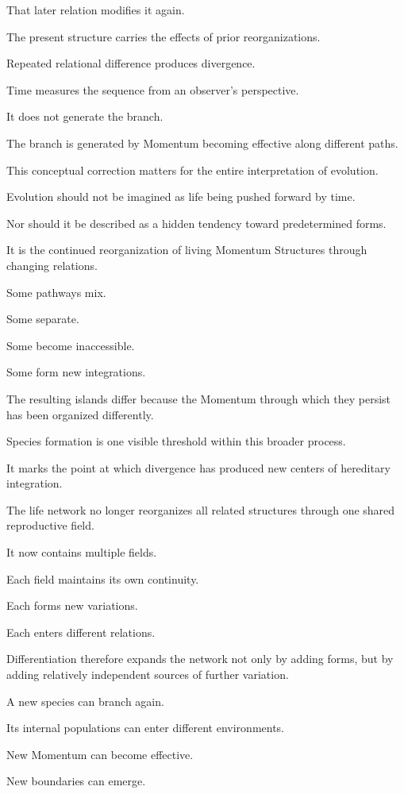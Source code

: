 That later relation modifies it again.

The present structure carries the effects of prior reorganizations.

Repeated relational difference produces divergence.

Time measures the sequence from an observer’s perspective.

It does not generate the branch.

The branch is generated by Momentum becoming effective along different paths.

This conceptual correction matters for the entire interpretation of evolution.

Evolution should not be imagined as life being pushed forward by time.

Nor should it be described as a hidden tendency toward predetermined forms.

It is the continued reorganization of living Momentum Structures through changing relations.

Some pathways mix.

Some separate.

Some become inaccessible.

Some form new integrations.

The resulting islands differ because the Momentum through which they persist has been organized differently.

Species formation is one visible threshold within this broader process.

It marks the point at which divergence has produced new centers of hereditary integration.

The life network no longer reorganizes all related structures through one shared reproductive field.

It now contains multiple fields.

Each field maintains its own continuity.

Each forms new variations.

Each enters different relations.

Differentiation therefore expands the network not only by adding forms, but by adding relatively independent sources of further variation.

A new species can branch again.

Its internal populations can enter different environments.

New Momentum can become effective.

New boundaries can emerge.

